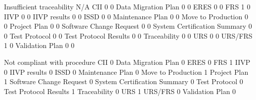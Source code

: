 \documentclass{article}
\begin{document}
\begin{Schunk}
\begin{Soutput}
                               Insufficient traceability N/A
  CII                                                  0   0
  Data Migration Plan                                  0   0
  ERES                                                 0   0
  FRS                                                  1   0
  IIVP                                                 0   0
  IIVP results                                         0   0
  ISSD                                                 0   0
  Maintenance Plan                                     0   0
  Move to Production                                   0   0
  Project Plan                                         0   0
  Software Change Request                              0   0
  System Certification Summary                         0   0
  Test Protocol                                        0   0
  Test Protocol Results                                0   0
  Traceability                                         0   0
  URS                                                  0   0
  URS/FRS                                              1   0
  Validation Plan                                      0   0
                              
                               Not compliant with procedure
  CII                                                     0
  Data Migration Plan                                     0
  ERES                                                    0
  FRS                                                     1
  IIVP                                                    0
  IIVP results                                            0
  ISSD                                                    0
  Maintenance Plan                                        0
  Move to Production                                      1
  Project Plan                                            1
  Software Change Request                                 0
  System Certification Summary                            0
  Test Protocol                                           0
  Test Protocol Results                                   1
  Traceability                                            0
  URS                                                     1
  URS/FRS                                                 0
  Validation Plan                                         0
                              

\end{Soutput}
\end{Schunk}
\end{document}
